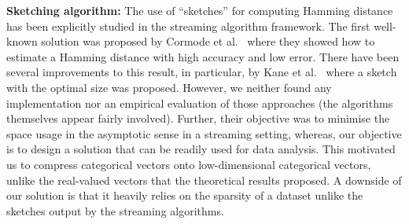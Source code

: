 \textbf{Sketching algorithm:} The use of ``sketches'' for computing Hamming distance has been explicitly studied in the streaming algorithm framework. The first well-known solution was proposed by Cormode et al.~\cite{CormodeDIM03} where they showed how to estimate a Hamming distance with high accuracy and low error. There have been several improvements to this result, in particular, by Kane et al.~\cite{KaneNW10} where a sketch with the optimal size was proposed. However, we neither found any implementation nor an empirical evaluation of those approaches (the algorithms themselves appear fairly involved). Further, their objective was to minimise the space usage in the asymptotic sense in a streaming setting, whereas, our objective is to design a solution that can be readily used for data analysis. This motivated us to compress categorical vectors onto low-dimensional categorical vectors, unlike the real-valued vectors that the theoretical results proposed. 
A downside of our solution is that it heavily relies on the sparsity of a dataset unlike the sketches output by the streaming algorithms.%








